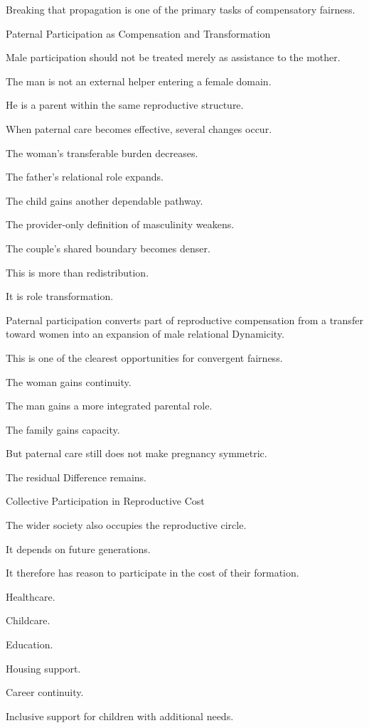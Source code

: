 Breaking that propagation is one of the primary tasks of compensatory fairness.

Paternal Participation as Compensation and Transformation

Male participation should not be treated merely as assistance to the mother.

The man is not an external helper entering a female domain.

He is a parent within the same reproductive structure.

When paternal care becomes effective, several changes occur.

The woman’s transferable burden decreases.

The father’s relational role expands.

The child gains another dependable pathway.

The provider-only definition of masculinity weakens.

The couple’s shared boundary becomes denser.

This is more than redistribution.

It is role transformation.

Paternal participation converts part of reproductive compensation from a transfer toward women into an expansion of male relational Dynamicity.

This is one of the clearest opportunities for convergent fairness.

The woman gains continuity.

The man gains a more integrated parental role.

The family gains capacity.

But paternal care still does not make pregnancy symmetric.

The residual Difference remains.

Collective Participation in Reproductive Cost

The wider society also occupies the reproductive circle.

It depends on future generations.

It therefore has reason to participate in the cost of their formation.

Healthcare.

Childcare.

Education.

Housing support.

Career continuity.

Inclusive support for children with additional needs.

